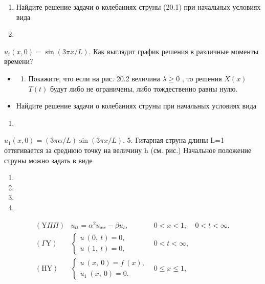 \documentclass[
  ukrainian,
]{article}
\providecommand{\tightlist}{%
  \setlength{\itemsep}{0pt}\setlength{\parskip}{0pt}}
\begin{document}
\begin{enumerate}
\def\labelenumi{\arabic{enumi}.}
\setcounter{enumi}{1}
\item
  Найдите решение задачи о колебаниях струны (20.1) при начальных
  условиях вида
\item
\end{enumerate}

\(u_t(x, 0) = \sin(3\pi x/L).\) Как выглядит график решения в различные
моменты времени?

\begin{itemize}
\tightlist
\item
  \begin{enumerate}
  \def\labelenumi{\arabic{enumi}.}
  \setcounter{enumi}{2}
  \tightlist
  \item
    Покажите, что если на рис. 20.2 величина \(\lambda \geqslant 0\) ,
    то решения \(X(x)\) \(T(t)\) будут либо не ограничены, либо
    тождественно равны нулю.
  \end{enumerate}
\item
  Найдите решение задачи о колебаниях струны при начальных условиях вида
\end{itemize}

\begin{enumerate}
\def\labelenumi{\arabic{enumi}.}
\setcounter{enumi}{11}
\tightlist
\item
\end{enumerate}

\(u_1(x, 0) = (3\pi \alpha/L)\sin(3\pi x/L).\) 5. Гитарная струна длины
L=1 оттягивается за среднюю точку на величину h (см. рис.) Начальное
положение струны можно задать в виде

\begin{enumerate}
\def\labelenumi{\arabic{enumi}.}
\setcounter{enumi}{12}
\tightlist
\item
\item
\item
\item
\end{enumerate}

\[
\begin{aligned} (\mathrm{Y} \Pi \Pi) & u_{tt} = \alpha^2 u_{xx} - \beta u_t, & 0 < x < 1, & 0 < t < \infty, \\ (\Gamma \mathrm{Y}) & \begin{cases} u \ (0, \ t) = 0, \\ u \ (1, \ t) = 0, \end{cases} & 0 < t < \infty, \\ (\mathrm{H} \mathrm{Y}) & \begin{cases} u \ (x, \ 0) = f \ (x), \\ u_1 \ (x, \ 0) = 0. \end{cases} & 0 \leqslant x \leqslant 1, \end{aligned}
\]
\end{document}
